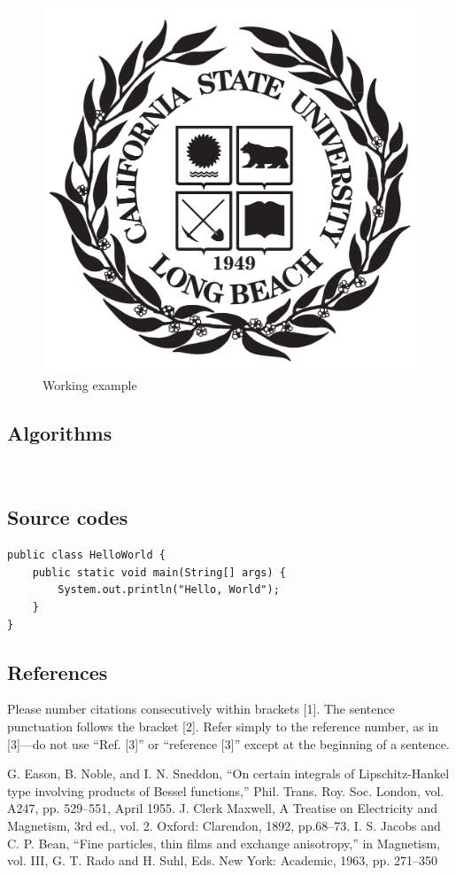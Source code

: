\documentclass{article}
\begin{document}
\begin{figure}[h]
\centering
\includegraphics[width=0.4\columnwidth]{fig1.png}
\caption{Working example}
\end{figure}




\subsection{Algorithms}
\begin{algorithmic}
 \\
\ELSE
    \ENDIF
\ENDIF
\end{algorithmic}



\subsection{Source codes}
\begin{verbatim}
public class HelloWorld { 
    public static void main(String[] args) { 
        System.out.println("Hello, World"); 
    } 
}
\end{verbatim}

\subsection{References}
Please number citations consecutively within brackets [1]. The sentence punctuation follows the bracket [2]. Refer simply to the reference number, as in [3]—do not use “Ref. [3]” or “reference [3]” except at the beginning of a sentence.


\begin{thebibliography}{00}
 G. Eason, B. Noble, and I. N. Sneddon, ``On certain integrals of Lipschitz-Hankel type involving products of Bessel functions,'' Phil. Trans. Roy. Soc. London, vol. A247, pp. 529--551, April 1955.
 J. Clerk Maxwell, A Treatise on Electricity and Magnetism, 3rd ed., vol. 2. Oxford: Clarendon, 1892, pp.68--73.
 I. S. Jacobs and C. P. Bean, ``Fine particles, thin films and exchange anisotropy,'' in Magnetism, vol. III, G. T. Rado and H. Suhl, Eds. New York: Academic, 1963, pp. 271--350
\end{thebibliography}
\end{document}
